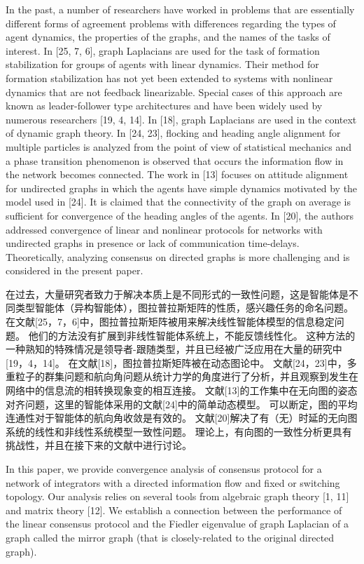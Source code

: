 \documentclass{article}
\begin{document}
{\color[gray]{0.5}
In the past, a number of researchers have worked in problems that are essentially diﬀerent forms of agreement problems with diﬀerences regarding the types of agent dynamics, the properties of the graphs, and {\color{green}the names of the tasks of interest}. 
In [25, 7, 6], graph Laplacians are used for the task of formation stabilization for groups of agents with linear dynamics. 
Their method for formation stabilization has not yet been extended to systems with nonlinear dynamics that are not feedback linearizable. 
Special cases of this approach are known as leader-follower type architectures and have been widely used by numerous researchers [19, 4, 14]. 
In [18], graph Laplacians are used in the context of dynamic graph theory. 
In [24, 23], {\color{green}ﬂocking and heading angle} alignment for multiple particles is analyzed from the point of view of statistical mechanics and a phase transition phenomenon is observed that occurs the information ﬂow in the network becomes connected. 
The work in [13] focuses on attitude alignment for undirected graphs in which the agents have simple dynamics motivated by the model used in [24]. 
It is claimed that the connectivity of the graph on average is suﬃcient for convergence of the heading angles of the agents. 
In [20], the authors addressed convergence of linear and nonlinear protocols for networks with undirected graphs in presence or lack of communication time-delays. 
Theoretically, analyzing consensus on directed graphs is more challenging and is considered in the present paper.
}

在过去，大量研究者致力于解决本质上是不同形式的一致性问题，这是智能体是不同类型智能体（异构智能体），图拉普拉斯矩阵的性质，感兴趣任务的命名问题。
在文献[25，7，6]中，图拉普拉斯矩阵被用来解决线性智能体模型的信息稳定问题。
他们的方法没有扩展到非线性智能体系统上，不能反馈线性化。
这种方法的一种熟知的特殊情况是领导者-跟随类型，并且已经被广泛应用在大量的研究中[19，4，14]。
在文献[18]，图拉普拉斯矩阵被在动态图论中。
文献[24，23]中，多重粒子的群集问题和航向角问题从统计力学的角度进行了分析，并且观察到发生在网络中的信息流的相转换现象变的相互连接。
文献[13]的工作集中在无向图的姿态对齐问题，这里的智能体采用的文献[24]中的简单动态模型。
可以断定，图的平均连通性对于智能体的航向角收敛是有效的。
文献[20]解决了有（无）时延的无向图系统的线性和非线性系统模型一致性问题。
理论上，有向图的一致性分析更具有挑战性，并且在接下来的文献中进行讨论。

{\color[gray]{0.5}
In this paper, we provide convergence analysis of consensus protocol for a network of {\color{green}integrators} with a directed information ﬂow and ﬁxed or switching topology. 
Our analysis relies on several tools from algebraic graph theory [1, 11] and matrix theory [12]. 
We establish a connection between the performance of the linear consensus protocol and the Fiedler eigenvalue of graph Laplacian of a graph called the mirror graph (that is closely-related to the original directed graph).
}
\end{document}
